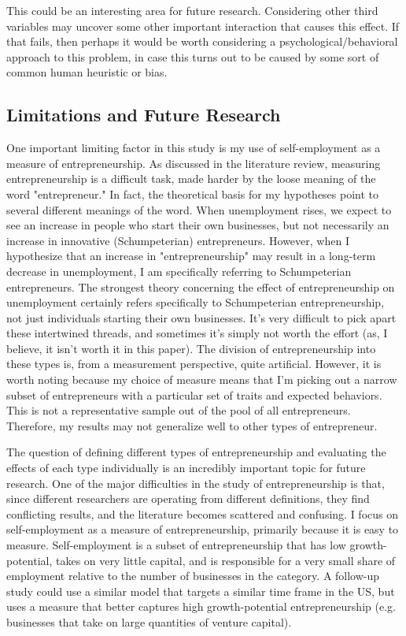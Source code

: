 \documentclass[]{ecca}
\begin{document}
This could be an interesting area for future research. Considering other third variables may uncover some other important interaction that causes this effect. If that fails, then perhaps it would be worth considering a psychological/behavioral approach to this problem, in case this turns out to be caused by some sort of common human heuristic or bias. 
	
\subsection{Limitations and Future Research}

One important limiting factor in this study is my use of self-employment as a measure of entrepreneurship. As discussed in the literature review, measuring entrepreneurship is a difficult task, made harder by the loose meaning of the word "entrepreneur." In fact, the theoretical basis for my hypotheses point to several different meanings of the word. When unemployment rises, we expect to see an increase in people who start their own businesses, but not necessarily an increase in innovative (Schumpeterian) entrepreneurs. However, when I hypothesize that an increase in "entrepreneurship" may result in a long-term decrease in unemployment, I am specifically referring to Schumpeterian entrepreneurs. The strongest theory concerning the effect of entrepreneurship on unemployment certainly refers specifically to Schumpeterian entrepreneurship, not just individuals starting their own businesses. It's very difficult to pick apart these intertwined threads, and sometimes it's simply not worth the effort (as, I believe, it isn't worth it in this paper). The division of entrepreneurship into these types is, from a measurement perspective, quite artificial. However, it is worth noting because my choice of measure means that I'm picking out a narrow subset of entrepreneurs with a particular set of traits and expected behaviors. This is not a representative sample out of the pool of all entrepreneurs. Therefore, my results may not generalize well to other types of entrepreneur. 
	
The question of defining different types of entrepreneurship and evaluating the effects of each type individually is an incredibly important topic for future research. One of the major difficulties in the study of entrepreneurship is that, since different researchers are operating from different definitions, they find conflicting results, and the literature becomes scattered and confusing. I focus on self-employment as a measure of entrepreneurship, primarily because it is easy to measure. Self-employment is a subset of entrepreneurship that has low growth-potential, takes on very little capital, and is responsible for a very small share of employment relative to the number of businesses in the category. A follow-up study could use a similar model that targets a similar time frame in the US, but uses a measure that better captures high growth-potential entrepreneurship (e.g. businesses that take on large quantities of venture capital). 
\end{document}
